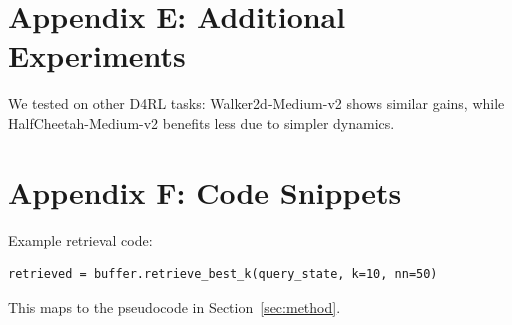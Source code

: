 \documentclass{article}
\begin{document}
\section{Appendix E: Additional Experiments}

We tested on other D4RL tasks: Walker2d-Medium-v2 shows similar gains, while HalfCheetah-Medium-v2 benefits less due to simpler dynamics.

\section{Appendix F: Code Snippets}

Example retrieval code:
\begin{verbatim}
retrieved = buffer.retrieve_best_k(query_state, k=10, nn=50)
\end{verbatim}

This maps to the pseudocode in Section~\ref{sec:method}.
\end{document}
